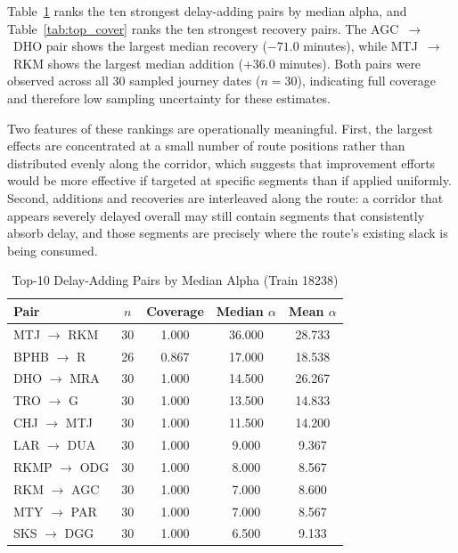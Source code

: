 \documentclass[conference]{IEEEtran}
\begin{document}
Table~\ref{tab:top_add} ranks the ten strongest delay-adding pairs by median alpha, and Table~\ref{tab:top_cover} ranks the ten strongest recovery pairs. The AGC~$\rightarrow$~DHO pair shows the largest median recovery ($-71.0$ minutes), while MTJ~$\rightarrow$~RKM shows the largest median addition ($+36.0$ minutes). Both pairs were observed across all 30 sampled journey dates ($n=30$), indicating full coverage and therefore low sampling uncertainty for these estimates.

Two features of these rankings are operationally meaningful. First, the largest effects are concentrated at a small number of route positions rather than distributed evenly along the corridor, which suggests that improvement efforts would be more effective if targeted at specific segments than if applied uniformly. Second, additions and recoveries are interleaved along the route: a corridor that appears severely delayed overall may still contain segments that consistently absorb delay, and those segments are precisely where the route's existing slack is being consumed.

\begin{table}[!t]
\centering
\caption{Top-10 Delay-Adding Pairs by Median Alpha (Train 18238)}
\label{tab:top_add}
\footnotesize
\setlength{\tabcolsep}{4.5pt}
\begin{tabular}{@{}lcccc@{}}
\toprule
Pair & $n$ & Coverage & Median $\alpha$ & Mean $\alpha$ \\
\midrule
MTJ $\rightarrow$ RKM & 30 & 1.000 & 36.000 & 28.733 \\
BPHB $\rightarrow$ R & 26 & 0.867 & 17.000 & 18.538 \\
DHO $\rightarrow$ MRA & 30 & 1.000 & 14.500 & 26.267 \\
TRO $\rightarrow$ G & 30 & 1.000 & 13.500 & 14.833 \\
CHJ $\rightarrow$ MTJ & 30 & 1.000 & 11.500 & 14.200 \\
LAR $\rightarrow$ DUA & 30 & 1.000 & 9.000 & 9.367 \\
RKMP $\rightarrow$ ODG & 30 & 1.000 & 8.000 & 8.567 \\
RKM $\rightarrow$ AGC & 30 & 1.000 & 7.000 & 8.600 \\
MTY $\rightarrow$ PAR & 30 & 1.000 & 7.000 & 8.567 \\
SKS $\rightarrow$ DGG & 30 & 1.000 & 6.500 & 9.133 \\
\bottomrule
\end{tabular}
\end{table}
\end{document}
